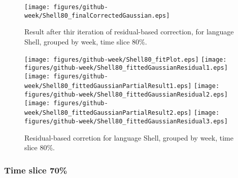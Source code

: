 \begin{figure}[]
\centering
{\texttt{[image: figures/github-week/Shell80\_finalCorrectedGaussian.eps]}}
\caption{Result after thir iteration of residual-based correction, for language Shell, grouped by week, time slice 80\%.}
\end{figure}


\begin{figure}[hb]
\centering
{}
{\texttt{[image: figures/github-week/Shell80\_fitPlot.eps]}}
{\texttt{[image: figures/github-week/Shell80\_fittedGaussianResidual1.eps]}}
{\texttt{[image: figures/github-week/Shell80\_fittedGaussianPartialResult1.eps]}}
{\texttt{[image: figures/github-week/Shell80\_fittedGaussianResidual2.eps]}}
{\texttt{[image: figures/github-week/Shell80\_fittedGaussianPartialResult2.eps]}}
{\texttt{[image: figures/github-week/Shell80\_fittedGaussianResidual3.eps]}}
\caption{Residual-based corretion for language Shell, grouped by week, time slice 80\%.}
\end{figure}


\clearpage 
\newpage 


\FloatBarrier

\subsubsection{Time slice 70\%}

